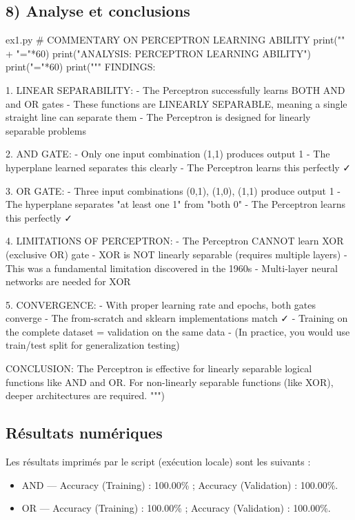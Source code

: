 \documentclass[12pt,a4paper]{article}
\begin{document}

\subsection*{8) Analyse et conclusions}

\begin{codeholder}{ex1.py}
# COMMENTARY ON PERCEPTRON LEARNING ABILITY
print("\n" + "="*60)
print("ANALYSIS: PERCEPTRON LEARNING ABILITY")
print("="*60)
print("""
FINDINGS:

1. LINEAR SEPARABILITY:
   - The Perceptron successfully learns BOTH AND and OR gates
   - These functions are LINEARLY SEPARABLE,
     meaning a single straight line can separate them
   - The Perceptron is designed for linearly separable problems

2. AND GATE:
   - Only one input combination (1,1) produces output 1
   - The hyperplane learned separates this clearly
   - The Perceptron learns this perfectly ✓

3. OR GATE:
   - Three input combinations (0,1), (1,0), (1,1) produce output 1
   - The hyperplane separates "at least one 1" from "both 0"
   - The Perceptron learns this perfectly ✓

4. LIMITATIONS OF PERCEPTRON:
   - The Perceptron CANNOT learn XOR (exclusive OR) gate
   - XOR is NOT linearly separable (requires multiple layers)
   - This was a fundamental limitation discovered in the 1960s
   - Multi-layer neural networks are needed for XOR

5. CONVERGENCE:
   - With proper learning rate and epochs, both gates converge
   - The from-scratch and sklearn implementations match ✓
   - Training on the complete dataset = validation on the same data
   - (In practice, you would use train/test split for generalization testing)

CONCLUSION:
The Perceptron is effective for linearly separable logical functions like AND and OR.
For non-linearly separable functions (like XOR), deeper architectures are required.
""")
\end{codeholder}

\subsection*{Résultats numériques}
Les résultats imprimés par le script (exécution locale) sont les suivants :
\begin{itemize}
    \item AND --- Accuracy (Training) : 100.00\% ; Accuracy (Validation) : 100.00\%.
    \item OR  --- Accuracy (Training) : 100.00\% ; Accuracy (Validation) : 100.00\%.
\end{itemize}
\end{document}
